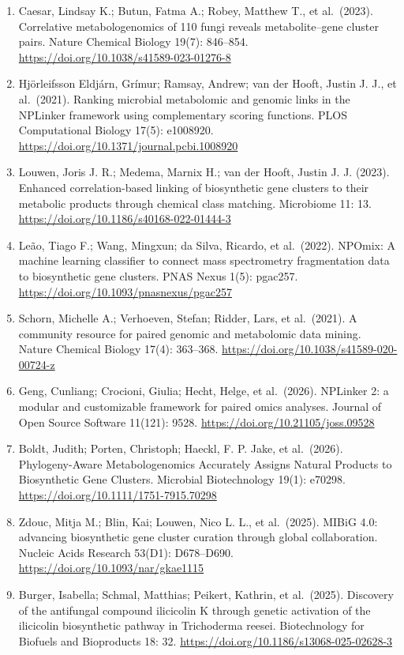 \documentclass[
  10pt,
  a4paper,
]{article}
\begin{document}
\small

\begin{enumerate}
\def\labelenumi{\arabic{enumi}.}
\item
  Caesar, Lindsay K.; Butun, Fatma A.; Robey, Matthew T., et al.~(2023). Correlative metabologenomics of 110 fungi reveals metabolite--gene cluster pairs. Nature Chemical Biology 19(7): 846--854. \url{https://doi.org/10.1038/s41589-023-01276-8}
\item
  Hjörleifsson Eldjárn, Grímur; Ramsay, Andrew; van der Hooft, Justin J. J., et al.~(2021). Ranking microbial metabolomic and genomic links in the NPLinker framework using complementary scoring functions. PLOS Computational Biology 17(5): e1008920. \url{https://doi.org/10.1371/journal.pcbi.1008920}
\item
  Louwen, Joris J. R.; Medema, Marnix H.; van der Hooft, Justin J. J. (2023). Enhanced correlation-based linking of biosynthetic gene clusters to their metabolic products through chemical class matching. Microbiome 11: 13. \url{https://doi.org/10.1186/s40168-022-01444-3}
\item
  Leão, Tiago F.; Wang, Mingxun; da Silva, Ricardo, et al.~(2022). NPOmix: A machine learning classifier to connect mass spectrometry fragmentation data to biosynthetic gene clusters. PNAS Nexus 1(5): pgac257. \url{https://doi.org/10.1093/pnasnexus/pgac257}
\item
  Schorn, Michelle A.; Verhoeven, Stefan; Ridder, Lars, et al.~(2021). A community resource for paired genomic and metabolomic data mining. Nature Chemical Biology 17(4): 363--368. \url{https://doi.org/10.1038/s41589-020-00724-z}
\item
  Geng, Cunliang; Crocioni, Giulia; Hecht, Helge, et al.~(2026). NPLinker 2: a modular and customizable framework for paired omics analyses. Journal of Open Source Software 11(121): 9528. \url{https://doi.org/10.21105/joss.09528}
\item
  Boldt, Judith; Porten, Christoph; Haeckl, F. P. Jake, et al.~(2026). Phylogeny-Aware Metabologenomics Accurately Assigns Natural Products to Biosynthetic Gene Clusters. Microbial Biotechnology 19(1): e70298. \url{https://doi.org/10.1111/1751-7915.70298}
\item
  Zdouc, Mitja M.; Blin, Kai; Louwen, Nico L. L., et al.~(2025). MIBiG 4.0: advancing biosynthetic gene cluster curation through global collaboration. Nucleic Acids Research 53(D1): D678--D690. \url{https://doi.org/10.1093/nar/gkae1115}
\item
  Burger, Isabella; Schmal, Matthias; Peikert, Kathrin, et al.~(2025). Discovery of the antifungal compound ilicicolin K through genetic activation of the ilicicolin biosynthetic pathway in Trichoderma reesei. Biotechnology for Biofuels and Bioproducts 18: 32. \url{https://doi.org/10.1186/s13068-025-02628-3}

\end{enumerate}
\end{document}
